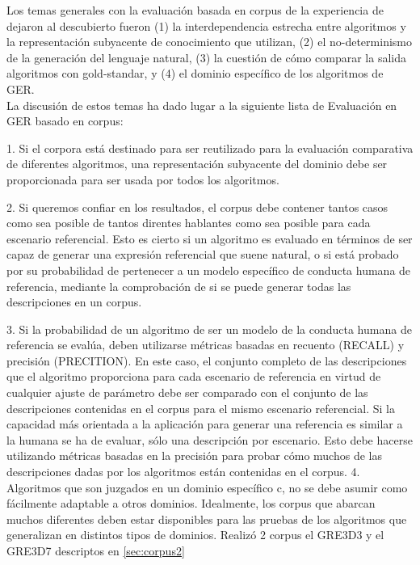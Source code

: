 %
Los temas generales con la evaluaci\'on basada en corpus de la experiencia de \cite{viethen-phd} dejaron
al descubierto fueron (1) la interdependencia estrecha entre algoritmos y la
representaci\'on subyacente de conocimiento que utilizan, (2) el no-determinismo de la generaci\'on del lenguaje natural, (3) la cuesti\'on de c\'omo comparar la salida algoritmos con gold-standar, y (4) el dominio espec\'ifico de los algoritmos de GER.\\
La discusi\'on de estos temas ha dado lugar a la siguiente lista de Evaluaci\'on en GER basado en corpus:

1. Si el corpora est\'a destinado para ser reutilizado para la evaluaci\'on comparativa de diferentes
algoritmos, una representaci\'on subyacente del dominio debe ser proporcionada para ser usada por todos los algoritmos.

2. Si queremos confiar en los resultados, el corpus debe contener tantos casos como sea posible de tantos direntes hablantes como sea posible para cada escenario referencial. 
Esto es cierto si un algoritmo es evaluado en t\'erminos de ser capaz de generar una expresi\'on referencial que suene natural, o si est\'a probado por su probabilidad de pertenecer a un modelo espec\'ifico de conducta humana de referencia, mediante la comprobaci\'on de si se puede generar todas las descripciones en un corpus.

3. Si la probabilidad de un algoritmo de ser un modelo de la conducta humana de referencia
se eval\'ua, deben utilizarse m\'etricas basadas en recuento (RECALL) y precisi\'on (PRECITION). En este
caso, el conjunto completo de las descripciones que el algoritmo proporciona para cada
escenario de referencia en virtud de cualquier ajuste de par\'ametro debe ser comparado con el
conjunto de las descripciones contenidas en el corpus para el mismo escenario referencial.
Si la capacidad m\'as orientada a la aplicaci\'on para generar una referencia es similar a la humana
se ha de evaluar, s\'olo una descripci\'on por escenario.
Esto debe hacerse utilizando m\'etricas basadas en la precisi\'on para probar c\'omo muchos de las
descripciones dadas por los algoritmos est\'an contenidas en el corpus.
4. Algoritmos que son juzgados en un dominio espec\'ifico c, no se debe asumir como
f\'acilmente adaptable a otros dominios. Idealmente, los corpus que abarcan muchos diferentes
deben estar disponibles para las pruebas de los algoritmos que generalizan en distintos tipos de dominios.
Realiz\'o 2 corpus el GRE3D3 y el GRE3D7 descriptos en \ref{sec:corpus2}



